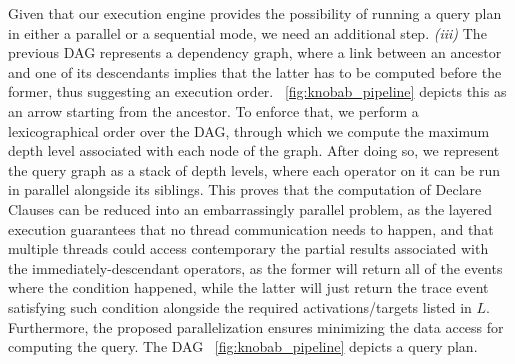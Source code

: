 Given that our execution engine provides the possibility of running a query plan in either a parallel or a sequential mode, we need   an additional step. \textit{(iii)} The previous DAG  represents a dependency graph, where a link between an ancestor and one of its descendants implies that the latter has to be computed before the former, thus suggesting an execution order. \figurename~\ref{fig:knobab_pipeline} depicts this as an arrow starting from the ancestor. To enforce that, we perform a lexicographical order over the DAG, through which we compute the maximum depth level associated with each node of the graph. After doing so, we represent the query graph as a stack of depth levels, where each operator on it can be run in parallel alongside its siblings.
 This proves that the computation of Declare Clauses can be reduced into an embarrassingly parallel problem, as the layered execution guarantees that no thread communication needs to happen, and that multiple threads could access contemporary the partial results associated with the immediately-descendant operators, as the former will return all of the events where the condition happened, while the latter will just return the trace event satisfying such condition alongside the required activations/targets listed in $L$. Furthermore, the proposed parallelization ensures minimizing the data access for computing the query. The DAG \figurename~\ref{fig:knobab_pipeline} depicts a query plan.
